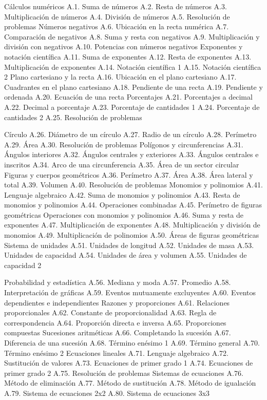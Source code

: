 Cálculos numéricos
A.1.  Suma de números
A.2.  Resta de números
A.3.  Multiplicación de números
A.4.  División de números
A.5.  Resolución de problemas
Números negativos
A.6.  Ubicación en la recta numérica
A.7.  Comparación de negativos
A.8.  Suma y resta con negativos
A.9.  Multiplicación y división con negativos
A.10. Potencias con números negativos
Exponentes y notación científica
A.11. Suma de exponentes
A.12. Resta de exponentes
A.13. Multiplicación de exponentes
A.14. Notación científica 1
A.15. Notación científica 2
Plano cartesiano y la recta
A.16. Ubicación en el plano cartesiano
A.17. Cuadrantes en el plano cartesiano
A.18. Pendiente de una recta
A.19. Pendiente y ordenada
A.20. Ecuación de una recta
Porcentajes
A.21. Porcentajes a decimal
A.22. Decimal a porcentaje
A.23. Porcentaje de cantidades 1
A.24. Porcentaje de cantidades 2
A.25. Resolución de problemas

Círculo
A.26. Diámetro de un círculo
A.27. Radio de un círculo
A.28. Perímetro
A.29. Área
A.30. Resolución de problemas
Polígonos y circunferencias
A.31. Ángulos interiores
A.32. Ángulos centrales y exteriores
A.33. Ángulos centrales e inscritos
A.34. Arco de una circunferencia
A.35. Área de un sector circular
Figuras y cuerpos geométricos
A.36. Perímetro
A.37. Área
A.38. Área lateral y total
A.39. Volumen
A.40. Resolución de problemas
Monomios y polinomios
A.41. Lenguaje algebraico
A.42. Suma de monomios y polinomios
A.43. Resta de monomios y polinomios
A.44. Operaciones combinadas
A.45. Perímetro de figuras geométricas
Operaciones con monomios y polinomios
A.46. Suma y resta de exponentes
A.47. Multiplicación de exponentes
A.48. Multiplicación y división de monomios
A.49. Multiplicación de polinomios
A.50. Áreas de figuras geométricas
Sistema de unidades
A.51. Unidades de longitud
A.52. Unidades de masa
A.53. Unidades de capacidad
A.54. Unidades de área y volumen
A.55. Unidades de capacidad 2

Probabilidad y estadística
A.56. Mediana y moda
A.57. Promedio
A.58. Interpretación de gráficas
A.59. Eventos mutuamente excluyentes
A.60. Eventos dependientes e independientes
Razones y proporciones
A.61. Relaciones proporcionales
A.62. Constante de proporcionalidad
A.63. Regla de correspondencia
A.64. Proporción directa e inversa
A.65. Proporciones compuestas
Sucesiones aritméticas
A.66. Completando la sucesión
A.67. Diferencia de una sucesión
A.68. Término enésimo 1
A.69. Término general
A.70. Término enésimo 2
Ecuaciones lineales
A.71. Lenguaje algebraico
A.72. Sustitución de valores
A.73. Ecuaciones de primer grado 1
A.74. Ecuaciones de primer grado 2
A.75. Resolución de problemas
Sistemas de ecuaciones
A.76. Método de eliminación
A.77. Método de sustitución
A.78. Método de igualación
A.79. Sistema de ecuaciones 2x2
A.80. Sistema de ecuaciones 3x3